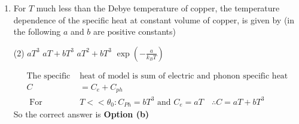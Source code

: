 \begin{enumerate}
\begin{figure}[H]
	\texttt{[image: Net-D-19-39]}
\end{figure}
The value of the base current $I_{B}$ is
 \begin{tasks}(4)
	\task[\textbf{a.}]$20 \mu \mathrm{A}$
	\task[\textbf{b.}]$40 \mu \mathrm{A}$
	\task[\textbf{c.}]$10 \mu \mathrm{A}$
	\task[\textbf{d.}]$100 \mu \mathrm{A}$ 
\end{tasks}
\begin{answer}
	\begin{align*}
	\begin{aligned}
	&\text{Apply K.V.L in input section}\\
	&-20 V+B I_{B} \times 5 K+I_{B} \times 500 K+0.7 V=0 \\
	&\Rightarrow I_{B}=\frac{193}{100 \times 5 K+500 K}=19.3 \mu A
	\end{aligned}
	\end{align*}
		So the correct answer is \textbf{Option (a)}
\end{answer}
\item For $T$ much less than the Debye temperature of copper, the temperature dependence of the specific heat at constant volume of copper, is given by (in the following $a$ and $b$ are positive constants)
 \begin{tasks}(2)
	\task[\textbf{a.}]$a T^{3}$
	\task[\textbf{b.}]$a T+b T^{3}$
	\task[\textbf{c.}] $a T^{2}+b T^{3}$
	\task[\textbf{d.}] $\exp \left(-\frac{a}{k_{B} T}\right)$
\end{tasks}
\begin{answer}
	\begin{align*}
	\text{The specific }&\text{heat of model is sum of electric and phonon specific heat}\\
	C&=C_{e}+C_{p h}\\
\text{	For }&T<<\theta_{0}: C_{P h}=b T^{3}\text{ and }C_{e}=a T \quad \therefore C=a T+b T^{3}
	\end{align*}
		So the correct answer is \textbf{Option (b)}
\end{answer}




\end{enumerate}
